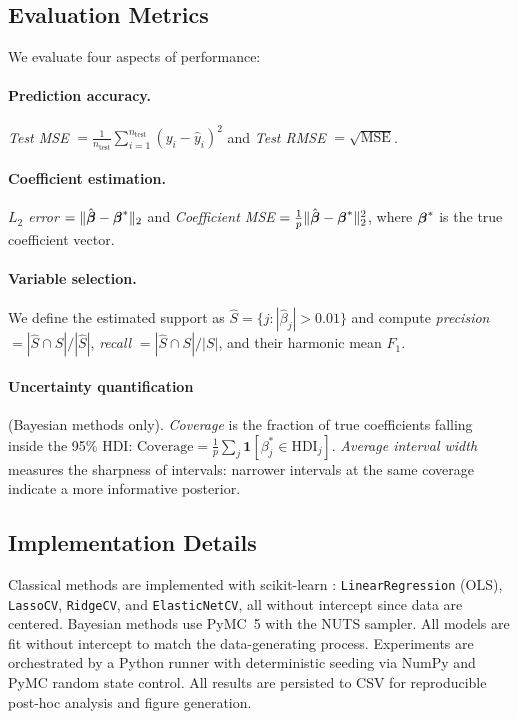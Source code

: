 \subsection{Evaluation Metrics}

We evaluate four aspects of performance:

\paragraph{Prediction accuracy.}
\emph{Test MSE} $= \frac{1}{n_{\text{test}}} \sum_{i=1}^{n_{\text{test}}} (y_i - \hat{y}_i)^2$ and \emph{Test RMSE} $= \sqrt{\text{MSE}}$.

\paragraph{Coefficient estimation.}
\emph{$L_2$ error} $= \|\hat{\boldsymbol{\beta}} - \boldsymbol{\beta}^*\|_2$ and \emph{Coefficient MSE} $= \frac{1}{p}\|\hat{\boldsymbol{\beta}} - \boldsymbol{\beta}^*\|_2^2$, where $\boldsymbol{\beta}^*$ is the true coefficient vector.

\paragraph{Variable selection.}
We define the estimated support as $\hat{S} = \{j : |\hat{\beta}_j| > 0.01\}$ and compute \emph{precision} $= |\hat{S} \cap S| / |\hat{S}|$, \emph{recall} $= |\hat{S} \cap S| / |S|$, and their harmonic mean \emph{$F_1$}.

\paragraph{Uncertainty quantification} (Bayesian methods only).
\emph{Coverage} is the fraction of true coefficients falling inside the 95\% HDI: $\text{Coverage} = \frac{1}{p} \sum_j \mathbf{1}[\beta_j^* \in \text{HDI}_j]$.
\emph{Average interval width} measures the sharpness of intervals: narrower intervals at the same coverage indicate a more informative posterior.

\subsection{Implementation Details}

Classical methods are implemented with scikit-learn \citep{pedregosa2011scikit}: \texttt{LinearRegression} (OLS), \texttt{LassoCV}, \texttt{RidgeCV}, and \texttt{ElasticNetCV}, all without intercept since data are centered.
Bayesian methods use PyMC~5 \citep{abril2023pymc} with the NUTS sampler.
All models are fit without intercept to match the data-generating process.
Experiments are orchestrated by a Python runner with deterministic seeding via NumPy and PyMC random state control.
All results are persisted to CSV for reproducible post-hoc analysis and figure generation.
